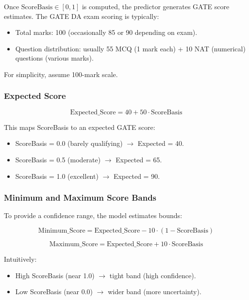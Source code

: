 \documentclass[sigconf,authordraft,twoside]{acmart}
\begin{document}
Once $\text{ScoreBasis} \in [0, 1]$ is computed, the predictor generates GATE score estimates. The GATE DA exam scoring is typically:

\begin{itemize}
\item Total marks: 100 (occasionally 85 or 90 depending on exam).
\item Question distribution: usually 55 MCQ (1 mark each) + 10 NAT (numerical) questions (various marks).
\end{itemize}

For simplicity, assume 100-mark scale.

\subsubsection{Expected Score}
\begin{equation}
\text{Expected\_Score} = 40 + 50 \cdot \text{ScoreBasis}
\end{equation}

This maps ScoreBasis to an expected GATE score:
\begin{itemize}
\item ScoreBasis = 0.0 (barely qualifying) $\to$ Expected = 40.
\item ScoreBasis = 0.5 (moderate) $\to$ Expected = 65.
\item ScoreBasis = 1.0 (excellent) $\to$ Expected = 90.
\end{itemize}

\subsubsection{Minimum and Maximum Score Bands}

To provide a confidence range, the model estimates bounds:

\begin{equation}
\text{Minimum\_Score} = \text{Expected\_Score} - 10 \cdot (1 - \text{ScoreBasis})
\end{equation}

\begin{equation}
\text{Maximum\_Score} = \text{Expected\_Score} + 10 \cdot \text{ScoreBasis}
\end{equation}

Intuitively:
\begin{itemize}
\item High ScoreBasis (near 1.0) $\to$ tight band (high confidence).
\item Low ScoreBasis (near 0.0) $\to$ wider band (more uncertainty).
\end{itemize}
\end{document}
